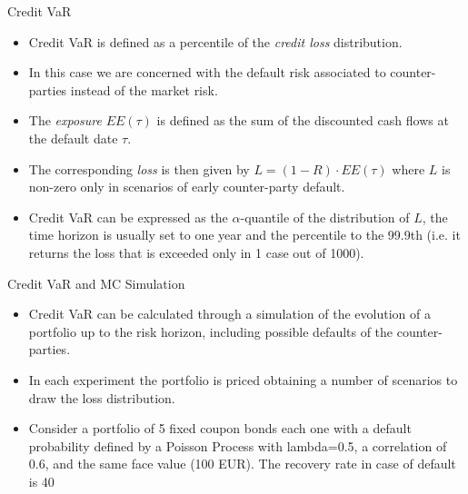 \documentclass{beamer}
\begin{document}
\begin{frame}{Credit VaR}
  \begin{itemize}	
    \item Credit VaR is defined as a percentile of the \emph{credit loss} distribution. 
    \item In this case we are concerned with the default risk associated to counter-parties instead of the market risk.
    \item The \emph{exposure} $EE(\tau)$ is defined as the sum of the discounted cash flows at the default date $\tau$. 
    \item The corresponding \emph{loss} is then given by $L =(1-R)\cdot EE(\tau)$ where $L$ is non-zero only in scenarios of early counter-party default.
    \item Credit VaR can be expressed as the $\alpha$-quantile of the distribution of $L$, the time horizon is usually set to one year and the percentile to the 99.9th (i.e. it returns the loss that is exceeded only in 1 case out of 1000).
  \end{itemize}
\end{frame}
  
\begin{frame}{Credit VaR and MC Simulation}
  \begin{itemize}
    \item Credit VaR can be calculated through a simulation of the evolution of a portfolio up to the risk horizon, including possible defaults of the counter-parties.
    \item In each experiment the portfolio is priced obtaining a number of scenarios to draw the loss distribution.
    \item Consider a portfolio of 5 fixed coupon bonds each one with a default probability defined by a Poisson Process with lambda=0.5, a correlation of 0.6, and the same face value (100 EUR). The recovery rate in case of default is 40%
    \end{itemize}
\end{frame}
\end{document}
